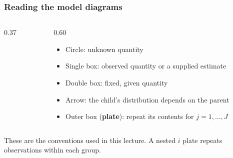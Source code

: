 \documentclass[10pt]{beamer}
\begin{document}
\begin{frame}
\frametitle{Reading the model diagrams}

  \begin{columns}[c,onlytextwidth]
    \begin{column}{0.37\textwidth}
      \centering
      \begin{xy}
      \end{xy}
    \end{column}
    \begin{column}{0.60\textwidth}
      \begin{itemize}
      \item Circle: unknown quantity
      \item Single box: observed quantity or a supplied estimate
      \item Double box: fixed, given quantity
      \item Arrow: the child's distribution depends on the parent
      \item Outer box (\textbf{plate}): repeat its contents for
        $j=1,\ldots,J$
      \end{itemize}
    \end{column}
  \end{columns}
  \medskip

  These are the conventions used in this lecture.
  A nested $i$ plate repeats observations within each group.
\end{frame}
\end{document}
